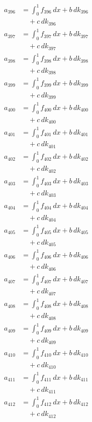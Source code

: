 \documentclass{article}
\begin{document}
\begin{align}
a_{396} &= \int_0^1 f_{396}\,dx + b\,dk_{396} \\
&\quad + c\,dk_{396} \\
a_{397} &= \int_0^1 f_{397}\,dx + b\,dk_{397} \\
&\quad + c\,dk_{397} \\
a_{398} &= \int_0^1 f_{398}\,dx + b\,dk_{398} \\
&\quad + c\,dk_{398} \\
a_{399} &= \int_0^1 f_{399}\,dx + b\,dk_{399} \\
&\quad + c\,dk_{399} \\
a_{400} &= \int_0^1 f_{400}\,dx + b\,dk_{400} \\
&\quad + c\,dk_{400} \\
a_{401} &= \int_0^1 f_{401}\,dx + b\,dk_{401} \\
&\quad + c\,dk_{401} \\
a_{402} &= \int_0^1 f_{402}\,dx + b\,dk_{402} \\
&\quad + c\,dk_{402} \\
a_{403} &= \int_0^1 f_{403}\,dx + b\,dk_{403} \\
&\quad + c\,dk_{403} \\
a_{404} &= \int_0^1 f_{404}\,dx + b\,dk_{404} \\
&\quad + c\,dk_{404} \\
a_{405} &= \int_0^1 f_{405}\,dx + b\,dk_{405} \\
&\quad + c\,dk_{405} \\
a_{406} &= \int_0^1 f_{406}\,dx + b\,dk_{406} \\
&\quad + c\,dk_{406} \\
a_{407} &= \int_0^1 f_{407}\,dx + b\,dk_{407} \\
&\quad + c\,dk_{407} \\
a_{408} &= \int_0^1 f_{408}\,dx + b\,dk_{408} \\
&\quad + c\,dk_{408} \\
a_{409} &= \int_0^1 f_{409}\,dx + b\,dk_{409} \\
&\quad + c\,dk_{409} \\
a_{410} &= \int_0^1 f_{410}\,dx + b\,dk_{410} \\
&\quad + c\,dk_{410} \\
a_{411} &= \int_0^1 f_{411}\,dx + b\,dk_{411} \\
&\quad + c\,dk_{411} \\
a_{412} &= \int_0^1 f_{412}\,dx + b\,dk_{412} \\
&\quad + c\,dk_{412} \\

\end{align}
\end{document}
